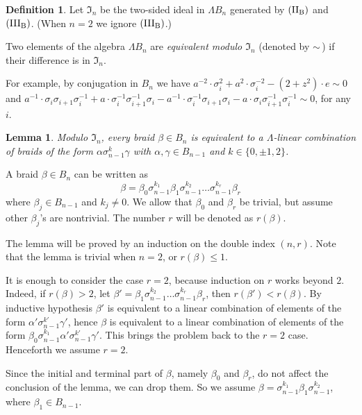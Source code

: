\documentclass[12pt]{amsart}
\newtheorem{lem}[thm]{Lemma}
\theoremstyle{definition}
\newtheorem{defn}[thm]{Definition}
\theoremstyle{remark}
\begin{document}
\begin{defn}
\label{defn:equivalence}
Let $\mathfrak I_n$ be the two-sided ideal in $\Lambda B_n$
generated by $\text{\rm(II$_\text{B}$)}$ and $\text{\rm(III$_{\text{B}}$)}$.
(When $n=2$ we ignore $\text{\rm(III$_{\text{B}}$)}$.)

Two elements of the algebra $\Lambda B_n$ are \emph {equivalent modulo $\mathfrak I_n$}
(denoted by $\sim$\,) if
their difference is in $\mathfrak I_n$.
\end{defn}

For example, by conjugation in $B_n$ we have
$a^{-2}\cdot \sigma_i^2 +a^2\cdot \sigma_i^{-2} -(2+z^2)\cdot e \sim 0$ and
$a^{-1}\cdot\sigma_i\sigma_{i+1}\sigma_i^{-1}
+a\cdot \sigma_i^{-1}\sigma_{i+1}^{-1}\sigma_i
-a^{-1}\cdot \sigma_i^{-1}\sigma_{i+1}\sigma_i
-a\cdot \sigma_i\sigma_{i+1}^{-1}\sigma_i^{-1}
\sim 0$,
for any $i$.

\begin{lem}
\label{lem:reduction}
Modulo $\mathfrak I_n$, every braid $\beta\in B_n$ is
equivalent to a $\Lambda$-linear combination of braids of the form
$\alpha\sigma_{n-1}^k \gamma$ with $\alpha,\gamma\in B_{n-1}$ and $k\in\{0,\pm1,2\}$.
\end{lem}

A braid $\beta\in B_n$ can be written as
\[
\beta=\beta_0\sigma_{n-1}^{k_1} \beta_1\sigma_{n-1}^{k_2} \dots \sigma_{n-1}^{k_r}\beta_r
\]
where $\beta_j\in B_{n-1}$ and $k_j\neq0$.
We allow that $\beta_0$ and $\beta_r$ be trivial,
but assume other $\beta_j$'s are nontrivial.
The number $r$ will be denoted as $r(\beta)$.

The lemma will be proved by an induction on the double index $(n,r)$.
Note that the lemma is trivial when $n=2$, or $r(\beta)\leq1$.

It is enough to consider the case $r=2$, because induction on $r$ works beyond $2$.
Indeed, if $r(\beta)>2$, let $\beta'=\beta_1\sigma_{n-1}^{k_2} \dots \sigma_{n-1}^{k_r}\beta_r$, then
$r(\beta')<r(\beta)$. By inductive hypothesis $\beta'$ is equivalent to a
linear combination of elements of the form $\alpha'\sigma_{n-1}^{k'} \gamma'$,
hence $\beta$ is equivalent to a linear combination of elements of the form
$\beta_0\sigma_{n-1}^{k_1} \alpha'\sigma_{n-1}^{k'} \gamma'$.
This brings the problem back to the $r=2$ case.
Henceforth we assume $r=2$.

Since the initial and terminal part of $\beta$, namely $\beta_0$ and $\beta_r$,
do not affect the conclusion of the lemma, we can drop them.
So we assume $\beta=\sigma_{n-1}^{k_1} \beta_1\sigma_{n-1}^{k_2}$, where $\beta_1\in B_{n-1}$.
\end{document}
